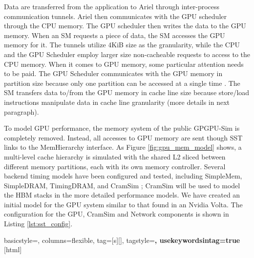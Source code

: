 Data are transferred from the application to Ariel through
inter-process communication tunnels. Ariel then communicates with the GPU scheduler through
the CPU memory. The GPU scheduler then writes the data to the GPU memory. When an SM
requests a piece of data, the SM accesses the GPU memory for it.
The tunnels utilize 4KiB size as the granularity, while the CPU and the GPU Scheduler
employ larger size non-cacheable requests to access to the CPU memory. When it comes to
GPU memory, some particular attention needs to be paid. The GPU Scheduler communicates with 
the GPU memory in partition size because only one partition can be accessed at a single time 
. The SM transfers data to/from the GPU memory in cache line size because store/load 
instructions manipulate data in cache line granularity (more details in next paragraph). 

To model GPU performance, the memory system of the public GPGPU-Sim is
completely removed. Instead, all accesses to GPU memory are sent though SST
links to the MemHierarchy interface. As Figure \ref{fig:gpu_mem_model} shows, a
multi-level cache hierarchy is simulated with the shared L2 sliced between
different memory partitions, each with its own memory controller. Several
backend timing models have been configured and tested, including SimpleMem,
SimpleDRAM, TimingDRAM, and CramSim \cite{healy2017}; CramSim will be used to
model the HBM stacks in the more detailed performance models. We have created an
initial model for the GPU system similar to that found in an Nvidia Volta. The
configuration for the GPU, CramSim and Network components is shown in Listing
\ref{lst:sst_config}.


{
  basicstyle={\small\ttfamily},
  columns=flexible,
  tag=[s]{[]},
  tagstyle=\color{dkgreen}\bfseries,
  usekeywordsintag=true
}[html]





